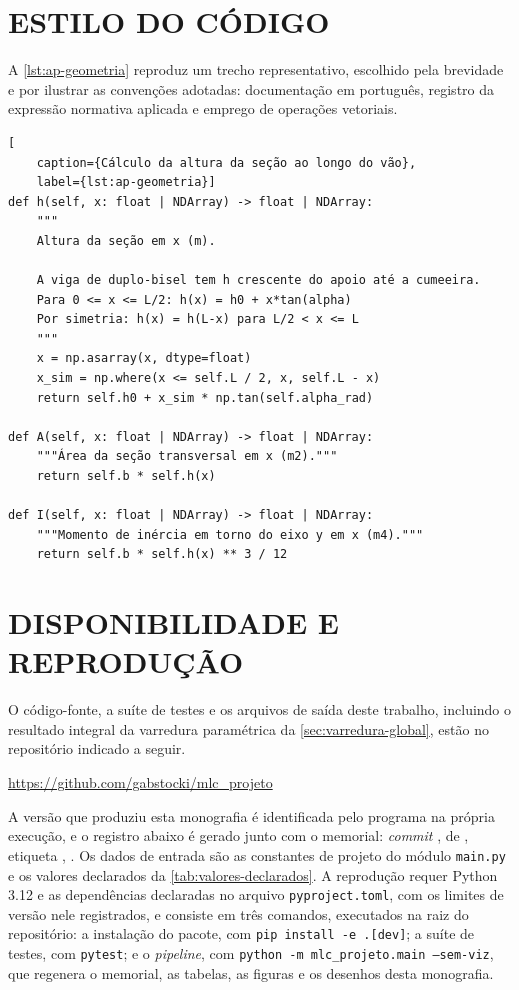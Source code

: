 \section{ESTILO DO CÓDIGO}\label{sec:ap-estilo}

A \autoref{lst:ap-geometria} reproduz um trecho representativo, escolhido pela
brevidade e por ilustrar as convenções adotadas: documentação em português,
registro da expressão normativa aplicada e emprego de operações vetoriais.

\filbreak
\begin{lstlisting}[
    caption={Cálculo da altura da seção ao longo do vão},
    label={lst:ap-geometria}]
def h(self, x: float | NDArray) -> float | NDArray:
    """
    Altura da seção em x (m).

    A viga de duplo-bisel tem h crescente do apoio até a cumeeira.
    Para 0 <= x <= L/2: h(x) = h0 + x*tan(alpha)
    Por simetria: h(x) = h(L-x) para L/2 < x <= L
    """
    x = np.asarray(x, dtype=float)
    x_sim = np.where(x <= self.L / 2, x, self.L - x)
    return self.h0 + x_sim * np.tan(self.alpha_rad)

def A(self, x: float | NDArray) -> float | NDArray:
    """Área da seção transversal em x (m2)."""
    return self.b * self.h(x)

def I(self, x: float | NDArray) -> float | NDArray:
    """Momento de inércia em torno do eixo y em x (m4)."""
    return self.b * self.h(x) ** 3 / 12
\end{lstlisting}


\section{DISPONIBILIDADE E REPRODUÇÃO}\label{sec:ap-disponibilidade}

O código-fonte, a suíte de testes e os arquivos de saída deste trabalho,
incluindo o resultado integral da varredura paramétrica da
\autoref{sec:varredura-global}, estão no repositório indicado a seguir.

\vspace{\onelineskip}
\noindent
\url{https://github.com/gabstocki/mlc_projeto}
\vspace{\onelineskip}

A versão que produziu esta monografia é identificada pelo programa na própria
execução, e o registro abaixo é gerado junto com o memorial: \textit{commit}
\texttt{\versaoCommit}, de \versaoData, etiqueta \versaoTag, \versaoEstado.
Os dados de entrada são as constantes de projeto do módulo \texttt{main.py} e os
valores declarados da \autoref{tab:valores-declarados}. A reprodução
requer Python 3.12 e as dependências declaradas no arquivo
\texttt{pyproject.toml}, com os limites de versão nele registrados, e consiste
em três comandos, executados na raiz do repositório: a instalação do pacote, com
\texttt{pip install -e .[dev]}; a suíte de testes, com \texttt{pytest}; e o
\textit{pipeline}, com \texttt{python -m mlc\_projeto.main --sem-viz}, que
regenera o memorial, as tabelas, as figuras e os desenhos desta monografia.
